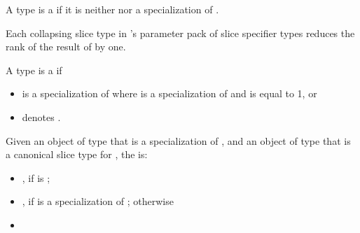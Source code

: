 \pnum
A type  is a  if
it is neither  nor
a specialization of .
\begin{note}
Each collapsing slice type in 's parameter pack
of slice specifier types
reduces the rank of the result of  by one.
\end{note}

\pnum
A type  is a  if
\begin{itemize}
\item
   is a specialization of 
  where  is a specialization of  and
   is equal to 1, or
\item
   denotes .
\end{itemize}

\pnum
Given an object  of type  that is a specialization of , and
an object  of type 
that is a canonical  slice type for ,
the 
is:
\begin{itemize}
\item
  ,
  if  is ;
\item
  ,
  if  is a specialization of ; otherwise
\item
\end{itemize}

